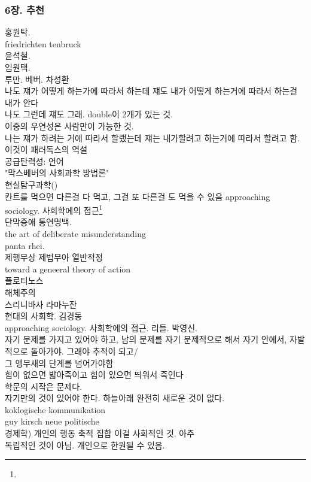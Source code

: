 \documentclass[12pt, a4paper]{article}
\begin{document}
\subsubsection{6장. 추천}

홍원탁. \\
friedrichten tenbruck\\
윤석철.\\
임원택.\\
루만. 베버. 차성환\\
나도 쟤가 어떻게 하는가에 따라서 하는데 쟤도 내가 어떻게 하는거에 따라서 하는걸 내가 안다\\
나도 그런데 쟤도 그래. double이 2개가 있는 것.\\
이중의 우연성은 사람만이 가능한 것. \\
나는 쟤가 하려는 거에 따라서 할랬는데 쟤는 내가할려고 하는거에 따라서 할려고 함. 이것이 패러독스의 역설\\
공급탄력성: 언어\\
"막스베버의 사회과학 방법론"\\
현실탐구과학()\\
칸트를 먹으면 다른걸 다 먹고, 그걸 또 다른걸 도 먹을 수 있음
approaching sociology. 사회학에의 접근\footnote{}\\
단막증애 통연명백.\\
the art of deliberate misunderstanding\\
panta rhei.\\
제행무상 제법무아 열반적정\\
toward a geneeral theory of action\\
플로티노스\\
해체주의\\
스리니바사 라마누잔\\
현대의 사회학. 김경동\\
approaching sociology. 사회학에의 접근. 리들. 박영신.\\
자기 문제를 가지고 있어야 하고, 남의 문제를 자기 문제적으로 해서 자기 안에서, 자발적으로 돌아가야. 그래야 추적이 되고/\\ 그 앵무새의 단계를 넘어가야함\\
힘이 없으면 밟아죽이고 힘이 있으면 띄워서 죽인다\\
학문의 시작은 문제다. \\
자기만의 것이 있어야 한다. 하늘아래 완전히 새로운 것이 없다.\\ koklogische kommunikation\\
guy kirsch neue politische \\
경제학) 개인의 행동 축적 집합 이걸 사회적인 것. 아주\\ 독립적인 것이 아님. 개인으로 한원될 수 있음.\\
\end{document}
